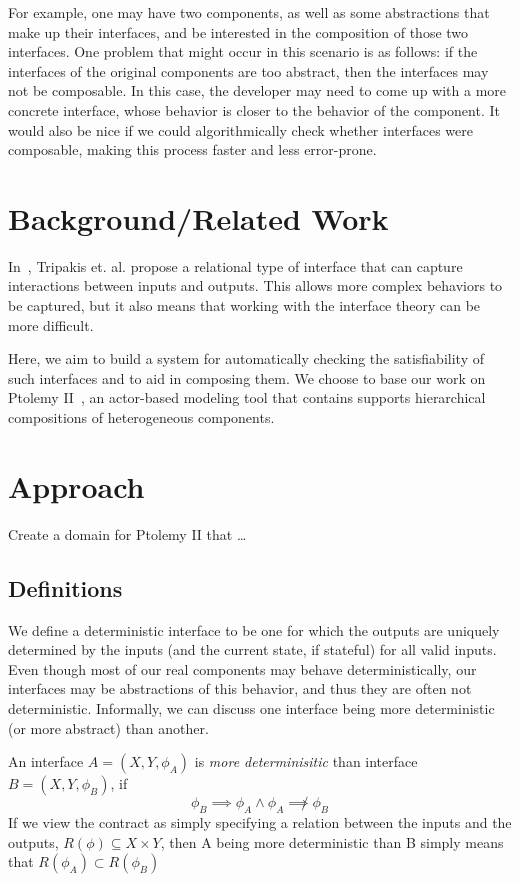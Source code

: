 \documentclass[preprint,11pt,authoryear]{sigplanconf}
\begin{document}
For example, one may have two components, as well as some abstractions that make up their interfaces, and be interested in the composition of those two interfaces.  One problem that might occur in this scenario is as follows: if the interfaces of the original components are too abstract, then the interfaces may not be composable.  In this case, the developer may need to come up with a more concrete interface, whose behavior is closer to the behavior of the component.  It would also be nice if we could algorithmically check whether interfaces were composable, making this process faster and less error-prone.

\section{Background/Related Work}
In~\cite{realationalInterfaces}, Tripakis et. al. propose a relational type of interface that can capture interactions between inputs and outputs.  This allows more complex behaviors to be captured, but it also means that working with the interface theory can be more difficult.

Here, we aim to build a system for automatically checking the satisfiability of such interfaces and to aid in composing them.  We choose to base our work on Ptolemy II~\cite{ptII}, an actor-based modeling tool that contains supports hierarchical compositions of heterogeneous components.

\section{Approach}
Create a domain for Ptolemy II that \dots

\subsection{Definitions}
We define a deterministic interface to be one for which the outputs are uniquely determined by the inputs (and the current state, if stateful) for all valid inputs.  Even though most of our real components may behave deterministically, our interfaces may be abstractions of this behavior, and thus they are often not deterministic.  Informally, we can discuss one interface being more deterministic (or more abstract) than another.

An interface $A=(X,Y,\phi_A)$ is \emph{more determinisitic} than interface $B=(X,Y,\phi_B)$, if
\[
\phi_B \implies \phi_A \wedge \phi_A \not\implies \phi_B
\]
If we view the contract as simply specifying a relation between the inputs and the outputs, $R(\phi) \subseteq X \times Y$, then A being more deterministic than B simply means that
$R(\phi_A) \subset R(\phi_B)$
\end{document}
